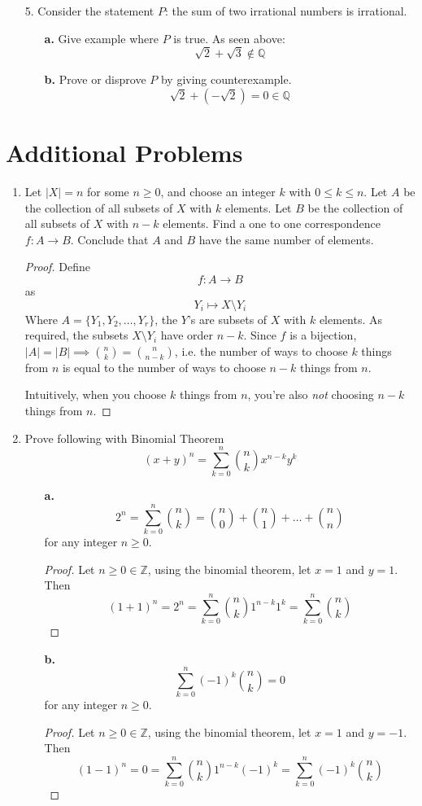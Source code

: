 \documentclass[hidelinks,12pt]{article}
\renewcommand{\geq}{\geqslant}
\renewcommand{\leq}{\leqslant}
\newcommand{\Z}{\mathbb{Z}}
\newcommand{\Q}{\mathbb{Q}}
\begin{document}
\begin{itemize}
\begin{enumerate}
\begin{proof}
        \end{proof}
    \end{enumerate}
    \item[5.] Consider the statement $P$: the sum of two irrational numbers is irrational.\begin{enumerate}
        \item[\bf{a.}] Give example where $P$ is true. \newline As seen above: $$\sqrt{2}+\sqrt{3}\notin\Q$$
        \item[\bf{b.}] Prove or disprove $P$ by giving counterexample. $$\sqrt{2}+(-\sqrt{2})=0\in\Q$$
    \end{enumerate}
\end{itemize}
\section*{Additional Problems}
\begin{enumerate}
    \item Let $|X|=n$ for some $n\geq0$, and choose an integer $k$ with $0\leq k\leq n$. Let $A$ be the collection of all subsets of $X$ with $k$ elements. Let $B$ be the collection of all subsets of $X$ with $n-k$ elements. Find a one to one correspondence $f:A\to B$. Conclude that $A$ and $B$ have the same number of elements.\begin{proof}
        Define $$f:A\to B$$ as $$Y_{i}\mapsto X\setminus Y_i$$ Where $A=\{Y_1,Y_2,\dots,Y_r\}$, the $Y$'s are subsets of $X$ with $k$ elements. As required, the subsets $X\setminus Y_i$ have order $n-k$. Since $f$ is a bijection, $|A|=|B|\implies\binom{n}{k}=\binom{n}{n-k}$, i.e. the number of ways to choose $k$ things from $n$ is equal to the number of ways to choose $n-k$ things from $n$.\par\null\par Intuitively, when you choose $k$ things from $n$, you're also \emph{not} choosing $n-k$ things from $n$.
    \end{proof}
    \item Prove following with Binomial Theorem $$(x+y)^n=\sum_{k=0}^n\binom{n}{k}x^{n-k}y^k$$\begin{enumerate}
        \item[\bf{a.}] $$2^n=\sum_{k=0}^n\binom{n}{k}=\binom{n}{0}+\binom{n}{1}+\dots+\binom{n}{n}$$ for any integer $n\geq0$.\begin{proof}
            Let $n\geq0\in\Z$, using the binomial theorem, let $x=1$ and $y=1$. Then $$(1+1)^n=2^n=\sum_{k=0}^n\binom{n}{k}1^{n-k}1^k=\sum_{k=0}^n\binom{n}{k}$$
        \end{proof}
        \item[\bf{b.}]$$\sum_{k=0}^n(-1)^k\binom{n}{k}=0$$ for any integer $n\geq0$.\begin{proof}
            Let $n\geq0\in\Z$, using the binomial theorem, let $x=1$ and $y=-1$. Then $$(1-1)^n=0=\sum_{k=0}^n\binom{n}{k}1^{n-k}(-1)^k=\sum_{k=0}^n(-1)^k\binom{n}{k}$$
        \end{proof}
    \end{enumerate}
\end{enumerate}
\end{document}
